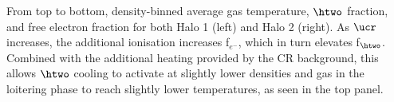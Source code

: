 \label{fig:efrac}
From top to bottom, density-binned average gas temperature, $\htwo$ fraction, and free electron fraction for both Halo 1 (left) and Halo 2  (right). As $\ucr$ increases, the additional ionisation increases f$_{e^-}$, which in turn elevates f$_{\htwo}$. Combined with the additional heating provided by the CR background, this allows $\htwo$ cooling to activate at slightly lower densities and gas in the loitering phase to reach slightly lower temperatures, as seen in the top panel.